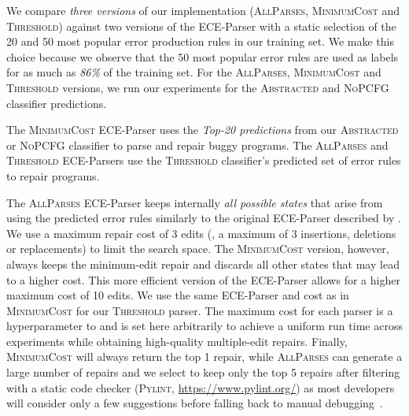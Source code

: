 We compare \emph{three versions} of our \toolname implementation
(\textsc{AllParses}, \textsc{MinimumCost} and \textsc{Threshold}) against two
versions of the ECE-Parser with a static selection of the 20 and 50 most popular
error production rules in our training set. We make this choice because we
observe that the 50 most popular error rules are used as labels for as much as
\emph{86\%} of the training set. For the \textsc{AllParses},
\textsc{MinimumCost} and \textsc{Threshold} versions, we run our experiments for
the \textsc{Abstracted} and \textsc{NoPCFG} classifier predictions.

The \textsc{MinimumCost} ECE-Parser uses the \emph{Top-20 predictions} from our
\textsc{Abstracted} or \textsc{NoPCFG} classifier to parse and repair buggy
programs. The \textsc{AllParses} and \textsc{Threshold} ECE-Parsers use the
\textsc{Threshold} classifier's predicted set of error rules to repair programs.

The \textsc{AllParses} ECE-Parser keeps internally \emph{all possible states}
that arise from using the predicted error rules similarly to the original
ECE-Parser described by \citet{Aho_1972}. We use a maximum repair cost of 3
edits (\ie, a maximum of 3 insertions, deletions or replacements) to limit the
search space. The \textsc{MinimumCost} version, however, always keeps the
minimum-edit repair and discards all other states that may lead to a higher
cost. This more efficient version of the ECE-Parser allows for a higher maximum
cost of 10 edits. We use the same ECE-Parser and cost as in \textsc{MinimumCost}
for our \textsc{Threshold} parser. The maximum cost for each parser is a
hyperparameter to \toolname{} and is set here arbitrarily to achieve a uniform
run time across experiments while obtaining high-quality multiple-edit repairs.
Finally, \textsc{MinimumCost} will always return the top 1 repair, while
\textsc{AllParses} can generate a large number of repairs and we select to keep
only the top 5 repairs after filtering with a static code checker
(\textsc{Pylint}, \url{https://www.pylint.org/}) as most developers will
consider only a few suggestions before falling back to manual
debugging~\citep{Kochhar2016-oc, Parnin2011-ce}.


